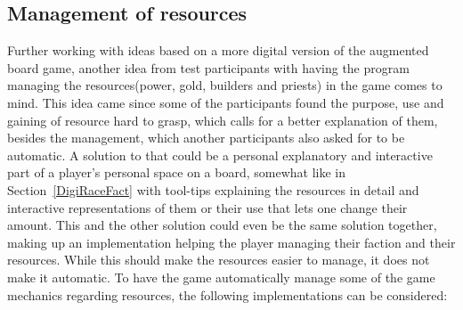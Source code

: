 \subsection{Management of resources}
Further working with ideas based on a more digital version of the augmented board game, another idea from test participants with having the program managing the resources(power, gold, builders and priests) in the game comes to mind. This idea came since some of the participants found the purpose, use and gaining of resource hard to grasp, which calls for a better explanation of them, besides the management, which another participants also asked for to be automatic. A solution to that could be a personal explanatory and interactive part of a player's personal space on a board, somewhat like in Section~\ref{DigiRaceFact} with tool-tips explaining the resources in detail and interactive representations of them or their use that lets one change their amount. This and the other solution could even be the same solution together, making up an implementation helping the player managing their faction and their resources. 
While this should make the resources easier to manage, it does not make it automatic. To have the game automatically manage some of the game mechanics regarding resources, the following implementations can be considered:
